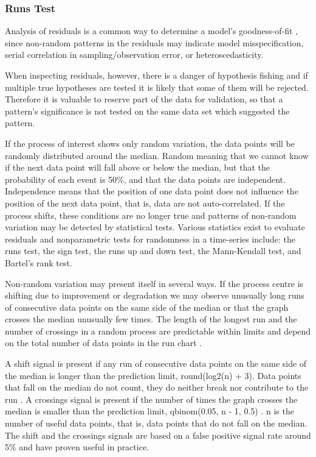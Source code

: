 \subsubsection*{Runs Test}

Analysis of residuals is a common way to determine a model’s goodness-of-fit \citep{Cox1968general}, since  non-random patterns in the residuals may indicate model misspecification, serial correlation in sampling/observation error, or heteroscedasticity. 

When inspecting residuals, however, there is a danger of hypothesis fishing and if multiple true hypotheses are tested it is likely that some of them will be rejected. Therefore it is valuable to reserve part of the data for validation, so that a pattern’s significance is not tested on the same data set which suggested the pattern.


If the process of interest shows only random variation, the data points will be randomly distributed around the median. Random meaning that we cannot know if the next data point will fall above or below the median, but that the probability of each event is 50\%, and that the data points are independent. Independence means that the position of one data point does not influence the position of the next data point, that is, data are not auto-correlated. If the process shifts, these conditions are no longer true and patterns of non-random variation may be detected by statistical tests. Various statistics exist to evaluate residuals and nonparametric tests for randomness in a time-series include: the runs test, the sign test, the runs up and down test, the Mann-Kendall test, and Bartel’s rank test.

Non-random variation may present itself in several ways. If the process centre is shifting due to improvement or degradation we may observe unusually long runs of consecutive data points on the same side of the median or that the graph crosses the median unusually few times. The length of the longest run and the number of crossings in a random process are predictable within limits and depend on the total number of data points in the run chart \citep{anhoj2015diagnostic}.

A shift signal is present if any run of consecutive data points on the same side of the median is longer than the prediction limit, round(log2(n) + 3). Data points that fall on the median do not count, they do neither break nor contribute to the run \cite{schilling2012surprising}. A crossings signal is present if the number of times the graph crosses the median is smaller than the prediction limit, qbinom(0.05, n - 1, 0.5) \citep{chen2010impacts}. n is the number of useful data points, that is, data points that do not fall on the median. The shift and the crossings signals are based on a false positive signal rate around 5\% and have proven useful in practice.
